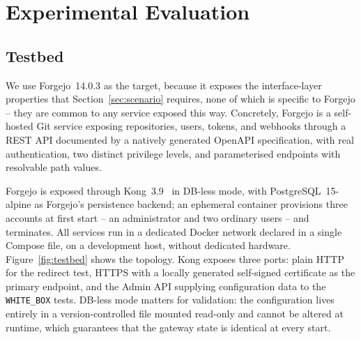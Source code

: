 \section{Experimental Evaluation}
\label{sec:eval}

\subsection{Testbed}


We use Forgejo~14.0.3 \cite{forgejoContributors2026} as the target, because it exposes the interface-layer properties that Section~\ref{sec:scenario} requires, none of which is specific to Forgejo -- they are common to any service exposed this way.
Concretely, Forgejo is a self-hosted Git service exposing repositories, users, tokens, and webhooks through a REST API documented by a natively generated OpenAPI specification, with real authentication, two distinct privilege levels, and parameterised endpoints with resolvable path values.

Forgejo is exposed through Kong~3.9~\cite{kongGateway2026} in DB-less mode, with PostgreSQL~15-alpine as Forgejo's persistence backend; an ephemeral container provisions three accounts at first start -- an administrator and two ordinary users -- and terminates.
All services run in a dedicated Docker network declared in a single Compose file, on a development host, without dedicated hardware.
Figure~\ref{fig:testbed} shows the topology.
Kong exposes three ports: plain HTTP for the redirect test, HTTPS with a locally generated self-signed certificate as the primary endpoint, and the Admin API supplying configuration data to the \texttt{WHITE\_BOX} tests.
DB-less mode matters for validation: the configuration lives entirely in a version-controlled file mounted read-only and cannot be altered at runtime, which guarantees that the gateway state is identical at every start.

